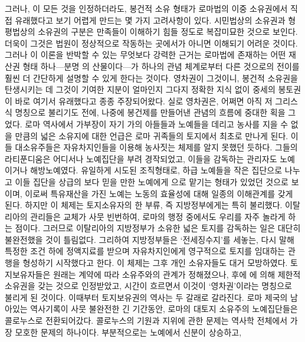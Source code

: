 그러나,
이 모든 것을 인정하더라도,
봉건적 소유 형태가 로마법의 이중 소유권에서 직접
유래했다고 보기 어렵게 만드는 몇 가지 고려사항이 있다.
시민법상의 소유권과 형평법상의 소유권의 구분은
만족들이 이해하기 힘들 정도로 복잡미묘한 것으로 보인다.
더욱이 그것은 법원이 정상적으로 작동하는 곳에서가 아니면 이해되기 어려운 것이다.
그러나 이 이론을 반박할 수 있는 무엇보다 강력한 근거는
로마법에 존재하는 어떤 재산권 형태 하나---분명 의 산물이다---가
하나의 관념 체계로부터 다른 것으로의 전이를 훨씬 더
간단하게 설명할 수 있게 한다는 것이다.
영차권이 그것이니,
봉건적 소유권을 탄생시키는 데
그것이 기여한 지분이 얼마인지 그다지 정확한 지식 없이
중세의 봉토권이 바로 여기서 유래했다고
종종
주장되어왔다.
실로
영차권은,
어쩌면 아직 저 그리스식 명칭으로 불리기도 전에,
나중에 봉건제를 만들어낸 관념의 흐름에 중대한 획을 그었다.
로마 역사에서
가부장이 자기 가의 아들들과 노예들을 데리고
농사를 지을 수 없을 만큼의 넓은 소유지에 대한 언급은
로마 귀족들의 토지에서 최초로 만나게 된다.
이들 대소유주들은
자유차지인들을 이용해 농사짓는 체제를 알지 못했던 듯하다.
그들의 라티푼디움은 어디서나
노예집단을 부려 경작되었고,
이들을 감독하는 관리자도 노예이거나 해방노예였다.
유일하게 시도된 조직형태로,
하급 노예들을 작은 집단으로 나누고
이들 집단을 상급의 보다 믿을 만한 노예에게
으로 맡기는
형태가 있었던 것으로 보이며,
이로써 특유재산을 가진 노예는 노동의 효율성에 대해
일종의 이해관계를 갖게 된다.
하지만 이 체제는 토지소유자의 한 부류, 즉
지방정부에게는
특히 불리했다.
이탈리아의 관리들은 교체가 사뭇 빈번하여,
로마의 행정 중에서도 우리를 자주 놀라게 하는 점이다.
그러므로 이탈리아의 지방정부가 소유한 넓은 토지를
감독하는 일은 대단히 불완전했을 것이 틀림없다.
그리하여 지방정부들은
`전세징수지'를 세놓는,
다시 말해 특정한 조건 하에
정액지료를 받으며
자유차지인에게
영구적으로
토지를
임대하는
관행을 형성하기 시작했다고 한다.
이 체제는 그후 개인 소유자들도 대거 모방하였다.
토지보유자들은
원래는 계약에 따라
소유주와의 관계가
정해졌으나, 후에
에 의해 제한적 소유권을 갖는 것으로 인정받았고,
시간이 흐르면서 이것이 `영차권'이라는 명칭으로 불리게 된 것이다.
이때부터
토지보유권의 역사는 두 갈래로 갈라진다.
로마 제국의 남아있는 역사기록이 사뭇 불완전한 긴 기간동안,
로마의 대토지 소유주의 노예집단들은
콜로누스로 전환되어갔다.
콜로누스의 기원과 지위에 관한 문제는
역사학 전체에서 가장 모호한 문제의 하나이다.
부분적으로는 노예에서 신분이 상승하고,
